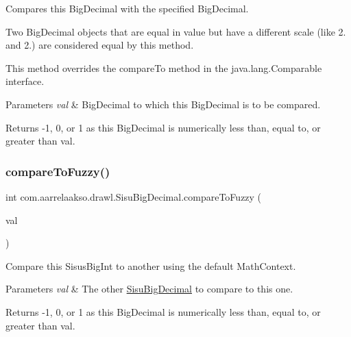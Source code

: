Compares this Big\+Decimal with the specified Big\+Decimal. 

Two Big\+Decimal objects that are equal in value but have a different scale (like 2. and 2.) are considered equal by this method. 

This method overrides the compare\+To method in the java.\+lang.\+Comparable interface.


\begin{DoxyParams}{Parameters}
{\em val} & Big\+Decimal to which this Big\+Decimal is to be compared. \\
\hline
\end{DoxyParams}
\begin{DoxyReturn}{Returns}
-\/1, 0, or 1 as this Big\+Decimal is numerically less than, equal to, or greater than val. 
\end{DoxyReturn}
\mbox{\label{classcom_1_1aarrelaakso_1_1drawl_1_1_sisu_big_decimal_a9a7c6100961355b8acb1dbcb40197136}} 
\subsubsection{\texorpdfstring{compare\+To\+Fuzzy()}{compareToFuzzy()}\hspace{0.1cm}{\footnotesize\ttfamily [1/2]}}
{\footnotesize\ttfamily int com.\+aarrelaakso.\+drawl.\+Sisu\+Big\+Decimal.\+compare\+To\+Fuzzy (\begin{DoxyParamCaption}\item[{\hyperlink{classcom_1_1aarrelaakso_1_1drawl_1_1_sisu_big_decimal}{Sisu\+Big\+Decimal}}]{val }\end{DoxyParamCaption})\hspace{0.3cm}{\ttfamily [protected]}}



Compare this Sisus\+Big\+Int to another using the default Math\+Context. 


\begin{DoxyParams}{Parameters}
{\em val} & The other \hyperlink{classcom_1_1aarrelaakso_1_1drawl_1_1_sisu_big_decimal}{Sisu\+Big\+Decimal} to compare to this one. \\
\hline
\end{DoxyParams}
\begin{DoxyReturn}{Returns}
-\/1, 0, or 1 as this Big\+Decimal is numerically less than, equal to, or greater than val. 
\end{DoxyReturn}
\mbox{\label{classcom_1_1aarrelaakso_1_1drawl_1_1_sisu_big_decimal_a2914bed4a69adb928d6edb2af9d578d4}} 

